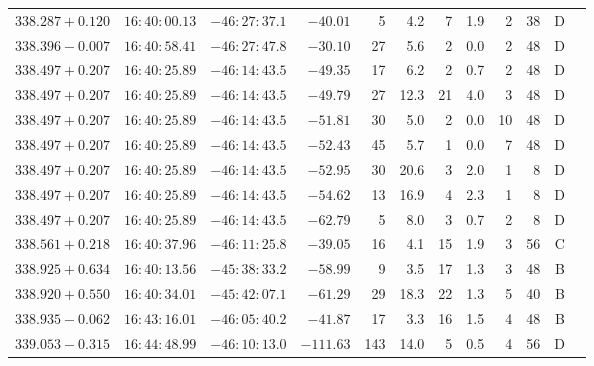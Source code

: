 {\begin{longtable}{c rrr rrrrr rr c}
    $338.287+0.120$     &   $16:40:00.13$     &   $-46:27:37.1$     &   $-40.01  $    &   5      &    4.2    &    7   &   1.9 &   2   &   38  &   D   \\
    $338.396-0.007$     &   $16:40:58.41$     &   $-46:27:47.8$     &   $-30.10  $    &   27     &    5.6    &    2   &   0.0 &   2   &   48  &   D   \\
    $338.497+0.207$     &   $16:40:25.89$     &   $-46:14:43.5$     &   $-49.35  $    &   17     &    6.2    &    2   &   0.7 &   2   &   48  &   D   \\
    $338.497+0.207$     &   $16:40:25.89$     &   $-46:14:43.5$     &   $-49.79  $    &   27     &   12.3    &    21  &   4.0 &   3   &   48  &   D   \\
    $338.497+0.207$     &   $16:40:25.89$     &   $-46:14:43.5$     &   $-51.81  $    &   30     &    5.0    &    2   &   0.0 &   10  &   48  &   D   \\
    $338.497+0.207$     &   $16:40:25.89$     &   $-46:14:43.5$     &   $-52.43  $    &   45     &    5.7    &    1   &   0.0 &   7   &   48  &   D   \\
    $338.497+0.207$     &   $16:40:25.89$     &   $-46:14:43.5$     &   $-52.95  $    &   30     &   20.6    &    3   &   2.0 &   1   &   8   &   D   \\
    $338.497+0.207$     &   $16:40:25.89$     &   $-46:14:43.5$     &   $-54.62  $    &   13     &   16.9    &    4   &   2.3 &   1   &   8   &   D   \\
    $338.497+0.207$     &   $16:40:25.89$     &   $-46:14:43.5$     &   $-62.79  $    &   5      &    8.0    &    3   &   0.7 &   2   &   8   &   D   \\
    $338.561+0.218$     &   $16:40:37.96$     &   $-46:11:25.8$     &   $-39.05  $    &   16     &    4.1    &    15  &   1.9 &   3   &   56  &   C   \\
    $338.925+0.634$     &   $16:40:13.56$     &   $-45:38:33.2$     &   $-58.99  $    &   9      &    3.5    &    17  &   1.3 &   3   &   48  &   B   \\
    $338.920+0.550$     &   $16:40:34.01$     &   $-45:42:07.1$     &   $-61.29  $    &   29     &   18.3    &    22  &   1.3 &   5   &   40  &   B   \\
    $338.935-0.062$     &   $16:43:16.01$     &   $-46:05:40.2$     &   $-41.87  $    &   17     &    3.3    &    16  &   1.5 &   4   &   48  &   B   \\
    $339.053-0.315$     &   $16:44:48.99$     &   $-46:10:13.0$     &   $-111.63 $    &   143    &   14.0    &    5   &   0.5 &   4   &   56  &   D   \\

\end{longtable}}
